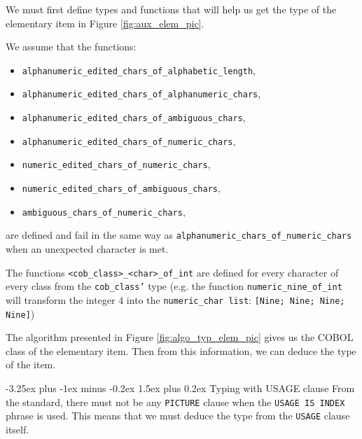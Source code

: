 \documentclass[a4paper,10pt]{article}
\makeatletter
\renewcommand{\paragraph}{\@startsection{paragraph}{4}{0ex}%
  {-3.25ex plus -1ex minus -0.2ex}%
  {1.5ex plus 0.2ex}%
{\normalfont\normalsize\bfseries}}
\newcommand{\coboli}[1]{\texttt{#1}}
\newcommand{\usagec}[1]{\texttt{USAGE} clause#1}
\newcommand{\picturec}[1]{\texttt{PICTURE} clause#1}
\makeatother
\begin{document}
We must first define types and functions that will help us get the type of the elementary item in
Figure \ref{fig:aux_elem_pic}.

We assume that the functions:
\begin{itemize}
  \item \texttt{alphanumeric_edited_chars_of_alphabetic_length},
  \item \texttt{alphanumeric_edited_chars_of_alphanumeric_chars},
  \item \texttt{alphanumeric_edited_chars_of_ambiguous_chars},
  \item \texttt{alphanumeric_edited_chars_of_numeric_chars},
  \item \texttt{numeric_edited_chars_of_numeric_chars},
  \item \texttt{numeric_edited_chars_of_ambiguous_chars},
  \item \texttt{ambiguous_chars_of_numeric_chars},
\end{itemize}
are defined and fail in the same way as \texttt{alphanumeric_chars_of_numeric_chars}
when an unexpected character is met.

The functions \texttt{<cob_class>_<char>_of_int} are defined for every character of
every class from the \texttt{cob_class'} type (e.g. the function \texttt{numeric_nine_of_int}
will transform the integer $4$ into the \texttt{numeric_char list}: \texttt{[Nine; Nine; Nine; Nine]})

The algorithm presented in Figure \ref{fig:algo_typ_elem_pic} gives us the COBOL class of the
elementary item. Then from this information, we can deduce the type of the item.

\paragraph{Typing with USAGE clause}
From the standard, there must not be any \picturec{} when the \coboli{USAGE IS INDEX} phrase is
used. This means that we must deduce the type from the \usagec{} itself.
\end{document}
